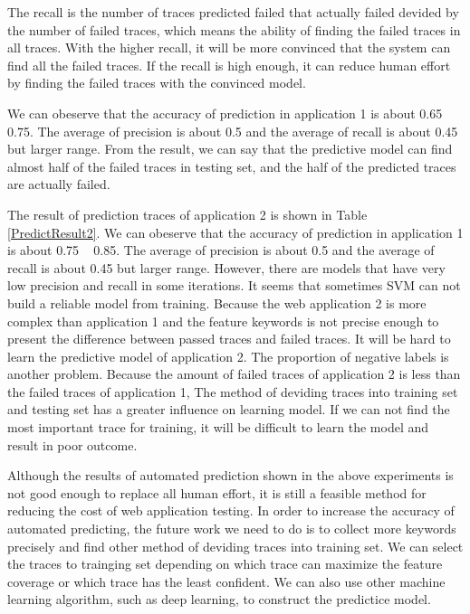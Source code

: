 The recall is the number of traces predicted failed that actually failed devided by the number of failed traces,
which means the ability of finding the failed traces in all traces.
With the higher recall, it will be more convinced that the system can find all the failed traces.
If the recall is high enough, it can reduce human effort by finding the failed traces with the convinced model.

We can obeserve that the accuracy of prediction in application 1 is about 0.65 ~ 0.75.
The average of precision is about 0.5 and the average of recall is about 0.45 but larger range.
From the result, we can say that the predictive model can find almost half of the failed traces in testing set,
and the half of the predicted traces are actually failed.

The result of prediction traces of application 2 is shown in Table \ref{PredictResult2}.
We can obeserve that the accuracy of prediction in application 1 is about 0.75 ~ 0.85.
The average of precision is about 0.5 and the average of recall is about 0.45 but larger range.
However, there are models that have very low precision and recall in some iterations.
It seems that sometimes SVM can not build a reliable model from training.
Because the web application 2 is more complex than application 1 
and the feature keywords is not precise enough to present the difference between passed traces and failed traces.
It will be hard to learn the predictive model of application 2.
The proportion of negative labels is another problem.
Because the amount of failed traces of application 2 is less than the failed traces of application 1,
The method of deviding traces into training set and testing set has a greater influence on learning model.
If we can not find the most important trace for training,
it will be difficult to learn the model and result in poor outcome.

Although the results of automated prediction shown in the above experiments is not good enough to replace all human effort,
it is still a feasible method for reducing the cost of web application testing.
In order to increase the accuracy of automated predicting,
the future work we need to do is to collect more keywords precisely and find other method of deviding traces into training set.
We can select the traces to trainging set depending on which trace can maximize the feature coverage or which trace has the least confident.
We can also use other machine learning algorithm, such as deep learning, to construct the predictice model.

